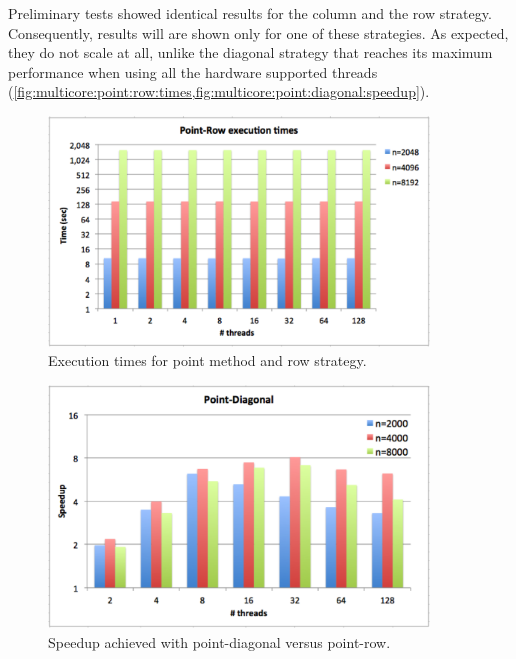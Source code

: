 \documentclass[../thesis]{subfiles}
\begin{document}
	Preliminary tests showed identical results for the column and the row strategy. Consequently, results will are shown only for one of these strategies. As expected, they do not scale at all, unlike the diagonal strategy that reaches its maximum performance when using all the hardware supported threads (\cref{fig:multicore:point:row:times,fig:multicore:point:diagonal:speedup}).

	\begin{figure}[hp]
		\begin{center}
			\includegraphics[width=0.9\textwidth]{assets/images/multicore/point-row.png}
		\end{center}
		\caption[Execution times for point-row]{Execution times for point method and row strategy.}
		\label{fig:multicore:point:row:times}
	\end{figure}

	\begin{figure}[hp]
		\begin{center}
			\includegraphics[width=0.9\textwidth]{assets/images/multicore/point-diagonal.png}
		\end{center}
		\caption[Speedup point-diagonal vs point-row]{Speedup achieved with point-diagonal versus point-row.}
		\label{fig:multicore:point:diagonal:speedup}
	\end{figure}
\end{document}
